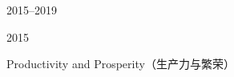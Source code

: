 \begin{chapter}{2015--2019}
\begin{section}{2015}
\begin{subsection}{Productivity and Prosperity（生产力与繁荣）}
\end{subsection}

\end{section}

\theendnotes{}

\end{chapter}

